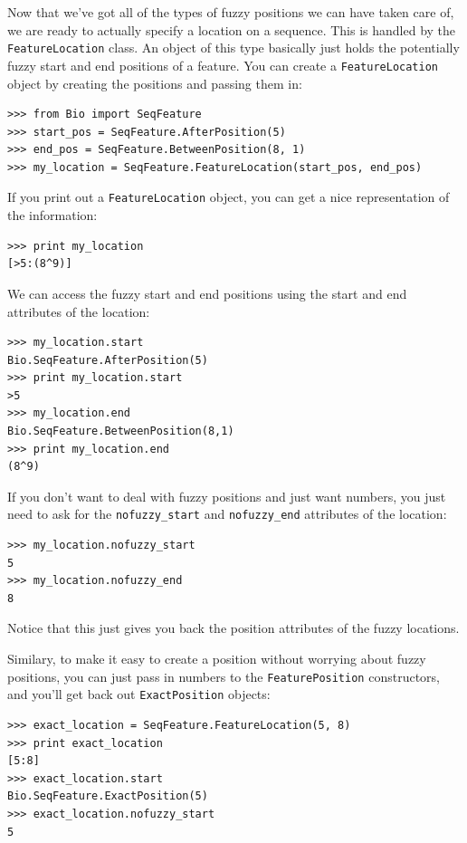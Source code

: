 \documentclass{report}
\begin{document}
Now that we've got all of the types of fuzzy positions we can have taken care of, we are ready to actually specify a location on a sequence. This is handled by the \verb|FeatureLocation| class. An object of this type basically just holds the potentially fuzzy start and end positions of a feature. You can create a \verb|FeatureLocation| object by creating the positions and passing them in:

\begin{verbatim}
>>> from Bio import SeqFeature
>>> start_pos = SeqFeature.AfterPosition(5)
>>> end_pos = SeqFeature.BetweenPosition(8, 1)
>>> my_location = SeqFeature.FeatureLocation(start_pos, end_pos)
\end{verbatim}

If you print out a \verb|FeatureLocation| object, you can get a nice representation of the information:

\begin{verbatim}
>>> print my_location
[>5:(8^9)]
\end{verbatim}

We can access the fuzzy start and end positions using the start and end attributes of the location:

\begin{verbatim}
>>> my_location.start
Bio.SeqFeature.AfterPosition(5)
>>> print my_location.start
>5
>>> my_location.end
Bio.SeqFeature.BetweenPosition(8,1)
>>> print my_location.end
(8^9)
\end{verbatim}

If you don't want to deal with fuzzy positions and just want numbers, you just need to ask for the \verb|nofuzzy_start| and \verb|nofuzzy_end| attributes of the location:

\begin{verbatim}
>>> my_location.nofuzzy_start
5
>>> my_location.nofuzzy_end
8
\end{verbatim}

Notice that this just gives you back the position attributes of the fuzzy locations.

Similary, to make it easy to create a position without worrying about fuzzy positions, you can just pass in numbers to the \verb|FeaturePosition| constructors, and you'll get back out \verb|ExactPosition| objects:

\begin{verbatim}
>>> exact_location = SeqFeature.FeatureLocation(5, 8)
>>> print exact_location
[5:8]
>>> exact_location.start
Bio.SeqFeature.ExactPosition(5)
>>> exact_location.nofuzzy_start
5
\end{verbatim}
\end{document}
